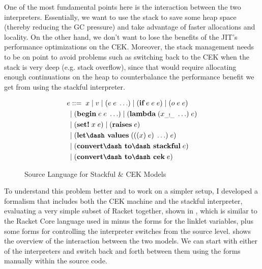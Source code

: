 One of the most fundamental points here is the interaction between the
two interpreters. Essentially, we want to use the stack to save some
heap space (thereby reducing the GC pressure) and take advantage of
faster allocations and locality. On the other hand, we don't want to
lose the benefits of the JIT's performance optimizations on the
CEK. Moreover, the stack management needs to be on point to avoid
problems such as switching back to the CEK when the stack is very deep
(e.g. stack overflow), since that would require allocating enough
continuations on the heap to counterbalance the performance benefit we
get from using the stackful interpreter.

\begin{figure}
  \vspace{-0.6cm}
  \footnotesize
  \begin{mdframed}
    \begin{align*}
      e &::=\; x\; |\; v\; |\; (e\; e\; \ldots)\; |\; (\textbf{if}\; e\; e\; e)\; |\; (o\; e\; e)\; \\
      \; &|\; (\textbf{begin}\; e\; e\; \ldots)\; |\; (\textbf{lambda}\; (x_{\_!\_}\; \ldots)\; e)\\
      \; &|\; (\textbf{set!}\; x\; e)\; |\; (\textbf{raises}\; e)\\
      \; &|\; (\textbf{let\dash values}\; (((x)\; e)\; \ldots)\; e)\\
      \; &|\; (\textbf{convert\dash to\dash stackful}\; e)\\
      \; &|\; (\textbf{convert\dash to\dash cek}\; e)
    \end{align*}
  \caption[hede]{Source Language for Stackful \& CEK Models}
  \label{fig:st-cek--source}
  \end{mdframed}
\end{figure}

To understand this problem better and to work on a simpler setup, I
developed a formalism that includes both the CEK machine and the
stackful interpreter, evaluating a very simple subset of Racket
together, shown in , which is similar to the
Racket Core language used in  minus
the forms for the linklet variables, plus some 
forms for controlling the interpreter switches from the source
level.  shows the overview of the
interaction between the two models. We can start with either of the
interpreters and switch back and forth between them using the
 forms manually within the source code.


